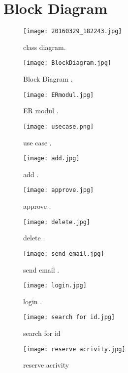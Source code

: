 \documentclass{article}
\begin{document}
    	\section{Block Diagram }
    		\begin{figure}[!h]
    			\centering
    			\texttt{[image: 20160329\_182243.jpg]}
    			\caption{class diagram.}
    		\end{figure}
    	\begin{figure}[!h]
    		\centering
    		\texttt{[image: BlockDiagram.jpg]}
    		\caption{Block Diagram .}
    	\end{figure}
    	\begin{figure}[!h]
    		\centering
    		\texttt{[image: ERmodul.jpg]}
    		\caption{ER modul .}
    	\end{figure}
    	\begin{figure}[!h]
    		\centering
    		\texttt{[image: usecase.png]}
    		\caption{use case .}
    	\end{figure}
    	\begin{figure}[!h]
    		\centering
    		\texttt{[image: add.jpg]}
    		\caption{ add .}
    	\end{figure}
   		\begin{figure}[!h]
   			\centering
   			\texttt{[image: approve.jpg]}
   			\caption{ approve .}
   		\end{figure}
		\begin{figure}[!h]
			\centering
			\texttt{[image: delete.jpg]}
			\caption{ delete .}
		\end{figure}
		\begin{figure}[!h]
			\centering
			\texttt{[image: send email.jpg]}
			\caption{ send email .}
		\end{figure}
		\begin{figure}[!h]
			\centering
			\texttt{[image: login.jpg]}
			\caption{ login .}
		\end{figure}
		\begin{figure}[!h]
			\centering
			\texttt{[image: search for id.jpg]}
			\caption{ search for id}
		\end{figure}
		\begin{figure}[!h]
			\centering
			\texttt{[image: reserve acrivity.jpg]}
			\caption{ reserve acrivity}
		\end{figure}
\end{document}
